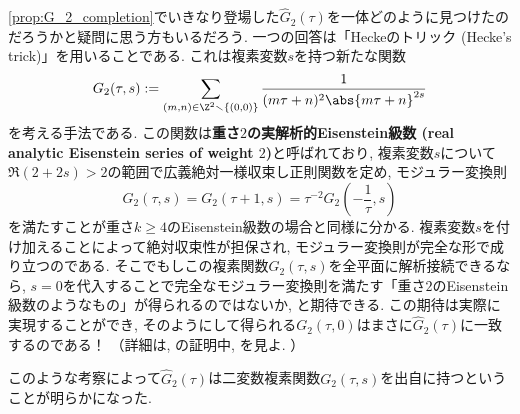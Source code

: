 \documentclass[11pt,b5paper,oneside,lualatex]{ltjsarticle} %
\numberwithin{equation}{section} %
\begin{document}
\begin{rem} \label{rem:Hecke_trick}
	\cref{prop:G_2_completion}でいきなり登場した$ \widehat{G}_2 (\tau) $を一体どのように見つけたのだろうかと疑問に思う方もいるだろう. 
	一つの回答は「Heckeのトリック (Hecke's trick)」を用いることである. 
	これは複素変数$ s $を持つ新たな関数
	\[
	G_2 (\tau, s) := \sum_{(m, n) \in \Z^2 \smallsetminus \{ (0, 0) \}} \frac{1}{(m\tau + n)^2 \abs{m\tau + n}^{2s}}
	\]
	を考える手法である. 
	この関数は\textbf{重さ$ 2 $の実解析的Eisenstein級数 (real analytic Eisenstein series of weight $ 2 $)}と呼ばれており, 
	複素変数$ s $について$ \Re(2+2s) > 2 $の範囲で広義絶対一様収束し正則関数を定め, モジュラー変換則
	\[
	G_2 (\tau, s) = G_2 (\tau+1, s) = \tau^{-2} G_2 \left( - \frac{1}{\tau}, s \right)
	\]
	を満たすことが重さ$ k \ge 4 $のEisenstein級数の場合と同様に分かる. 
	複素変数$ s $を付け加えることによって絶対収束性が担保され, モジュラー変換則が完全な形で成り立つのである. 
	そこでもしこの複素関数$ G_2 (\tau, s) $を全平面に解析接続できるなら, $ s=0 $を代入することで完全なモジュラー変換則を満たす「重さ$ 2 $のEisenstein級数のようなもの」が得られるのではないか, と期待できる. 
	この期待は実際に実現することができ, そのようにして得られる$ G_2 (\tau, 0) $はまさに$ \widehat{G}_2 (\tau) $に一致するのである！
	（詳細は\cite[Theorem 4.10.2]{DS}, \cite[pp.~19, Proposition 6]{1-2-3}の証明中, \cite[Lemma 6.2]{BFOR}を見よ. ）
	
	このような考察によって$ \widehat{G}_2 (\tau) $は二変数複素関数$ G_2 (\tau, s) $を出自に持つということが明らかになった. 
\end{rem}
\end{document}
